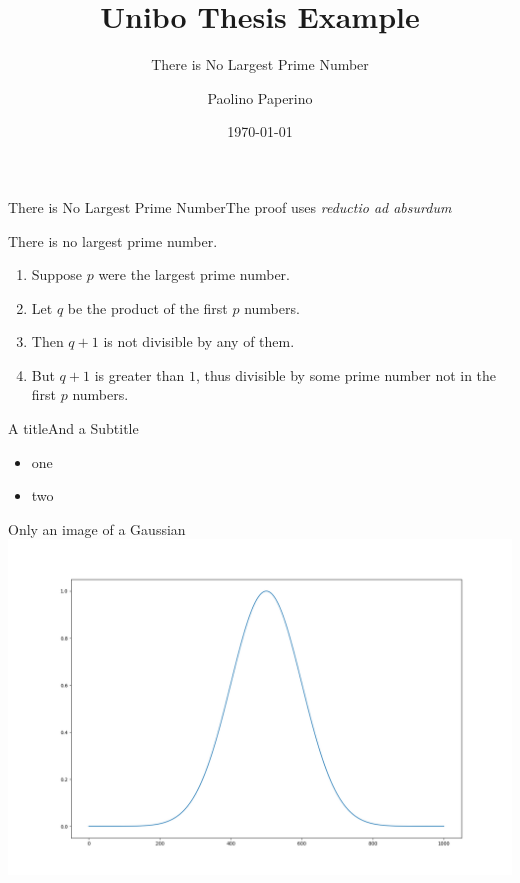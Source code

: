 \documentclass[slidescentered]{beamer}
\title{Unibo Thesis Example}
\subtitle{There is No Largest Prime Number}
\author{Paolino Paperino}
\date{\today}
\begin{document}
	\begin{frame}[noframenumbering]
		\titlepage
	\end{frame}


	\begin{frame}{There is No Largest Prime Number}{The proof uses \textit{reductio ad absurdum}}

		\begin{theorem}
			There is no largest prime number.
		\end{theorem}

		\begin{enumerate}

  		\item<1-| alert@1> Suppose $p$ were the largest prime number.
  		\item<2-> Let $q$ be the product of the first $p$ numbers.
  		\item<3-> Then $q+1$ is not divisible by any of them.
  		\item<1-> But $q + 1$ is greater than $1$, thus divisible by some prime
  		number not in the first $p$ numbers.

		\end{enumerate}

	\end{frame}

	\begin{frame}{A title}{And a Subtitle}

		\begin{itemize}
	  	\item one
	  	\item two
		\end{itemize}

	\end{frame}

	\begin{frame}{Only an image of a Gaussian}
		\centering\includegraphics[width=.8\paperwidth]{./imgs/gaussian.png}
	\end{frame}
\end{document}

